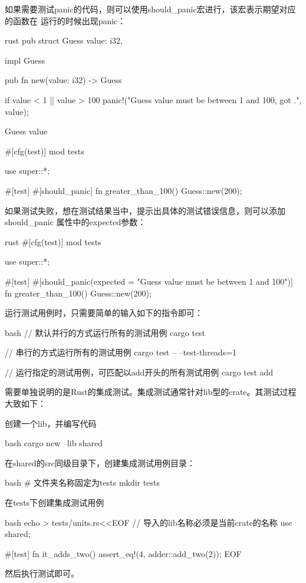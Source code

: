 如果需要测试panic的代码，则可以使用should\_panic宏进行，该宏表示期望对应的函数在
运行的时候出现panic：
\begin{code-block}{rust}
pub struct Guess {
    value: i32,
}

impl Guess {
    pub fn new(value: i32) -> Guess {
        if value < 1 || value > 100 {
            panic!("Guess value must be between 1 and 100, got {}.", value);
        }

        Guess {
            value
        }
    }
}

#[cfg(test)]
mod tests {
    use super::*;

    #[test]
    #[should_panic]
    fn greater_than_100() {
        Guess::new(200);
    }
}
\end{code-block}
如果测试失败，想在测试结果当中，提示出具体的测试错误信息，则可以添加should\_panic
属性中的expected参数：
\begin{code-block}{rust}
#[cfg(test)]
mod tests {
    use super::*;

    #[test]
    #[should_panic(expected = "Guess value must be between 1 and 100")]
    fn greater_than_100() {
        Guess::new(200);
    }
}
\end{code-block}

运行测试用例时，只需要简单的输入如下的指令即可：
\begin{code-block}{bash}
// 默认并行的方式运行所有的测试用例
cargo test

// 串行的方式运行所有的测试用例
cargo test -- --test-threads=1

// 运行指定的测试用例，可匹配以add开头的所有测试用例
cargo test add
\end{code-block}

需要单独说明的是Rust的集成测试。集成测试通常针对lib型的crate。其测试过程大致如下：
\begin{outline}[enumerate]
\1 创建一个lib，并编写代码

\begin{code-block}{bash}
cargo new --lib shared
\end{code-block}

\1 在shared的src同级目录下，创建集成测试用例目录：
\begin{code-block}{bash}
# 文件夹名称固定为tests
mkdir tests
\end{code-block}

\1 在tests下创建集成测试用例
\begin{code-block}{bash}
echo > tests/units.rs<<EOF
// 导入的lib名称必须是当前crate的名称
use shared;

#[test]
fn it_adds_two() {
    assert_eq!(4, adder::add_two(2));
}
EOF
\end{code-block}
然后执行测试即可。
\end{outline}

